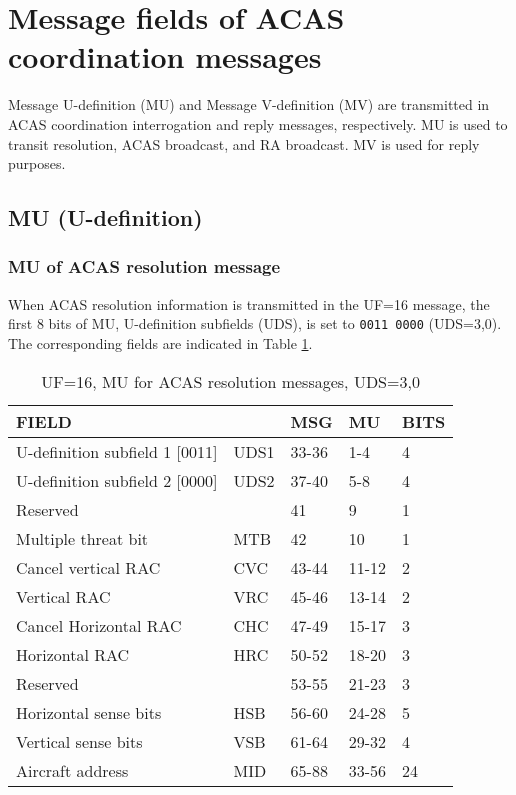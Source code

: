 \section{Message fields of ACAS coordination messages}


Message U-definition (MU) and Message V-definition (MV) are transmitted in ACAS coordination interrogation and reply messages, respectively. MU is used to transit resolution, ACAS broadcast, and RA broadcast. MV is used for reply purposes.

\subsection{MU (U-definition)}

\subsubsection{MU of ACAS resolution message}

When ACAS resolution information is transmitted in the UF=16 message, the first 8 bits of MU, U-definition subfields (UDS), is set to \texttt{0011 0000} (UDS=3,0). The corresponding fields are indicated in Table \ref{tb:acas_mu_uds30}.

\begin{table}[ht]
\caption{UF=16, MU for ACAS resolution messages, UDS=3,0}
\label{tb:acas_mu_uds30}
\begin{tabular}{|l|l|l|l|l|}
\hline
\textbf{FIELD} & \textbf{} & \textbf{MSG} & \textbf{MU} & \textbf{BITS} \\ \hline
U-definition subfield 1 [0011] & UDS1 & 33-36 & 1-4 & 4 \\ \hline
U-definition subfield 2 [0000] & UDS2 & 37-40 & 5-8 & 4 \\ \hline
Reserved &  & 41 & 9 & 1 \\ \hline
Multiple threat bit & MTB & 42 & 10 & 1 \\ \hline
Cancel vertical RAC & CVC & 43-44 & 11-12 & 2 \\ \hline
Vertical RAC & VRC & 45-46 & 13-14 & 2 \\ \hline
Cancel Horizontal RAC & CHC & 47-49 & 15-17 & 3 \\ \hline
Horizontal RAC & HRC & 50-52 & 18-20 & 3 \\ \hline
Reserved &  & 53-55 & 21-23 & 3 \\ \hline
Horizontal sense bits & HSB & 56-60 & 24-28 & 5 \\ \hline
Vertical sense bits & VSB & 61-64 & 29-32 & 4 \\ \hline
Aircraft address & MID & 65-88 & 33-56 & 24 \\ \hline
\end{tabular}
\end{table}

